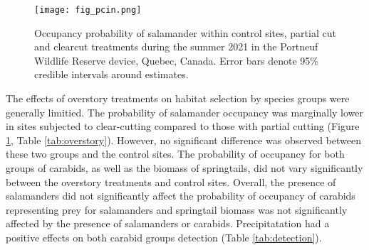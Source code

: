 \begin{figure}[ht]
  \centering
  \texttt{[image: fig\_pcin.png]}
  \caption[Occupancy probability of salamander under differentes overstory treatments]{Occupancy probability of salamander within control sites, partial cut and clearcut treatments during the summer 2021 in the Portneuf Wildlife Reserve device, Quebec, Canada. 
  Error bars denote 95\% credible intervals around estimates.}
  \label{fig:pcin}
\end{figure}

The effects of overstory treatments on habitat selection by species groups were generally limitied.
The probability of salamander occupancy was marginally lower in sites subjected to clear-cutting compared to those with partial cutting (Figure \ref{fig:pcin}, Table \ref{tab:overstory}). However, no significant difference was observed between these two groups and the control sites. 
The probability of occupancy for both groups of carabids, as well as the biomass of springtails, did not vary significantly between the overstory treatments and control sites. 
Overall, the presence of salamanders did not significantly affect the probability of occupancy of carabids representing prey for salamanders and springtail biomass was not significantly affected by the presence of salamanders or carabids.
Precipitatation had a positive effects on both carabid groups detection (Table \ref{tab:detection}). 

